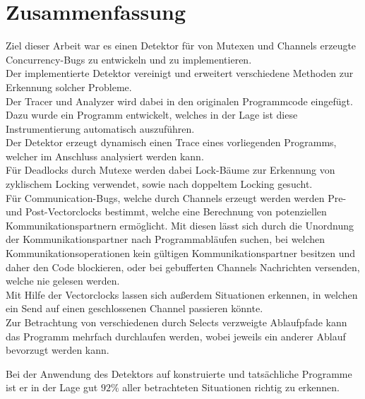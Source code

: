 \chapter{Zusammenfassung}\label{chap:conclusion}
Ziel dieser Arbeit war es einen Detektor für von Mutexen 
und Channels erzeugte Concurrency-Bugs zu entwickeln und zu implementieren.\\
Der implementierte Detektor vereinigt und erweitert verschiedene Methoden 
zur Erkennung solcher Probleme.\\
Der Tracer und Analyzer wird dabei in den originalen Programmcode eingefügt.
Dazu wurde ein Programm entwickelt, welches in der Lage ist diese Instrumentierung
automatisch auszuführen.\\
Der Detektor erzeugt dynamisch einen Trace 
eines vorliegenden Programms, welcher im Anschluss analysiert werden kann.\\
Für Deadlocks durch Mutexe werden dabei Lock-Bäume zur Erkennung von zyklischem 
Locking verwendet, sowie nach doppeltem Locking gesucht.\\
Für Communication-Bugs, welche durch Channels erzeugt werden
werden Pre- und Post-Vectorclocks bestimmt, welche eine Berechnung
von potenziellen Kommunikationspartnern ermöglicht. Mit diesen lässt sich 
durch die Unordnung der Kommunikationspartner nach Programmabläufen suchen, 
bei welchen Kommunikationsoperationen kein gültigen Kommunikationspartner 
besitzen und daher den Code blockieren, oder bei gebufferten Channels 
Nachrichten versenden, welche nie gelesen werden. \\
Mit Hilfe der Vectorclocks lassen sich außerdem Situationen erkennen, 
in welchen ein Send auf einen geschlossenen Channel passieren könnte.\\
Zur Betrachtung von verschiedenen durch Selects verzweigte Ablaufpfade
kann das Programm mehrfach durchlaufen werden, wobei jeweils ein 
anderer Ablauf bevorzugt werden kann.

Bei der Anwendung des Detektors auf konstruierte und tatsächliche Programme 
ist er in der Lage gut $92\%$ aller betrachteten 
Situationen richtig zu erkennen. 